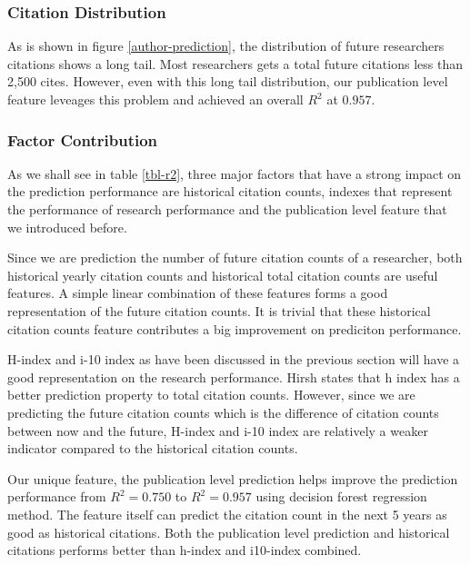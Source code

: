 


\subsubsection{Citation Distribution}
As is shown in figure \ref{author-prediction}, the distribution of future researchers citations shows a long tail. 
Most researchers gets a total future citations less than 2,500 cites.
However, even with this long tail distribution, our publication level feature leveages this problem and achieved an overall $R^2$ at $0.957$.

\subsubsection{Factor Contribution}
As we shall see in table \ref{tbl-r2}, three major factors that have a strong impact on the prediction performance are historical citation counts, indexes that represent the performance of research performance and the publication level feature that we introduced before.

Since we are prediction the number of future citation counts of a researcher, both historical yearly citation counts and historical total citation counts are useful features. A simple linear combination of these features forms a good representation of the future citation counts. It is trivial that these historical citation counts feature contributes a big improvement on prediciton performance.

H-index and i-10 index as have been discussed in the previous section will have a good representation on the research performance. Hirsh states that h index has a better prediction property to total citation counts\cite{Hirsh2007does}. However, since we are predicting the future citation counts which is the difference of citation counts between now and the future, H-index and i-10 index are relatively a weaker indicator compared to the historical citation counts.

Our unique feature, the publication level prediction helps improve the prediction performance from $R^2 = 0.750$ to $R^2 = 0.957$ using decision forest regression method. The feature itself can predict the citation count in the next 5 years as good as historical citations. Both the publication level prediction and historical citations performs better than h-index and i10-index combined.
